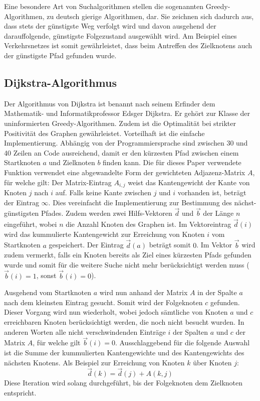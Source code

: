 Eine besondere Art von Suchalgorithmen stellen die sogenannten Greedy-Algorithmen, zu deutsch gierige Algorithmen, dar. Sie zeichnen sich dadurch aus, dass stets der günstigste Weg verfolgt wird und davon ausgehend der darauffolgende, günstigste Folgezustand ausgewählt wird. Am Beispiel eines Verkehrsnetzes ist somit gewährleistet, dass beim Antreffen des Zielknotens auch der günstigste Pfad gefunden wurde.

\subsection{Dijkstra-Algorithmus}
Der Algorithmus von Dijkstra ist benannt nach seinem Erfinder dem Mathematik- und Informatikprofessor Edsger Dijkstra. Er gehört zur Klasse der uninformierten Greedy-Algorithmen. Zudem ist die Optimalität bei strikter Positivität des Graphen gewährleistet.
Vorteilhaft ist die einfache Implementierung. Abhängig von der Programmiersprache sind zwischen 30 und 40 Zeilen an Code ausreichend, damit er den kürzesten Pfad zwischen einem Startknoten $a$ und Zielknoten $b$ finden kann. Die für dieses Paper verwendete Funktion verwendet eine abgewandelte Form der gewichteten Adjazenz-Matrix $A$, für welche gilt:
Der Matrix-Eintrag $A_{i,j}$ weist das Kantengewicht der Kante von Knoten $j$ nach $i$ auf. Falls keine Kante zwischen $j$ und $i$ vorhanden ist, beträgt der Eintrag $\infty$. Dies vereinfacht die Implementierung zur Bestimmung des nächst-günstigsten Pfades.
Zudem werden zwei Hilfs-Vektoren $\vec{d}$ und $\vec{b}$ der Länge $n$ eingeführt, wobei $n$ die Anzahl Knoten des Graphen ist. Im Vektoreintrag $\vec{d}(i)$ wird das kummulierte Kantengewicht zur Erreichung von Knoten $i$ vom Startknoten $a$ gespeichert. Der Eintrag $\vec{d}(a)$ beträgt somit $0$. Im Vektor $\vec{b}$ wird zudem vermerkt, falls ein Knoten bereits als Ziel eines kürzesten Pfads gefunden wurde und somit für die weitere Suche nicht mehr berücksichtigt werden muss ($\vec{b}(i)=1$, sonst $\vec{b}(i)=0$).

Ausgehend vom Startknoten $a$ wird nun anhand der Matrix $A$ in der Spalte $a$ nach dem kleinsten Eintrag gesucht. Somit wird der Folgeknoten $c$ gefunden. Dieser Vorgang wird nun wiederholt, wobei jedoch sämtliche von Knoten $a$ und $c$ erreichbaren Knoten berücksichtigt werden, die noch nicht besucht wurden. In anderen Worten alle nicht verschwindenden Einträge $i$ der Spalten $a$ und $c$ der Matrix $A$, für welche gilt $\vec{b}(i)=0$. Ausschlaggebend für die folgende Auswahl ist die Summe der kummulierten Kantengewichte und des Kantengewichts des nächsten Knotens. Als Beispiel zur Erreichung von Knoten $k$ über Knoten $j$:
\begin{equation}
\vec{d}(k)=\vec{d}(j)+A(k,j)
\end{equation}
Diese Iteration wird solang durchgeführt, bis der Folgeknoten dem Zielknoten entspricht.

